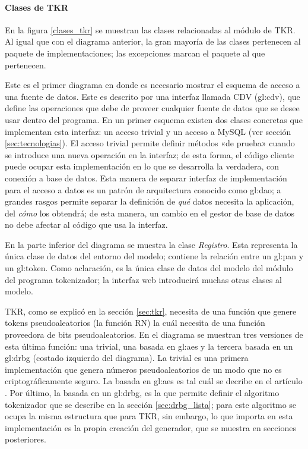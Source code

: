 %
%
%

\paragraph{Clases de TKR}

En la figura \ref{clases_tkr} se muestran las clases relacionadas al módulo de
TKR. Al igual que con el diagrama anterior, la gran mayoría de las clases
pertenecen al paquete de implementaciones; las excepciones marcan el paquete al
que pertenecen.

Este es el primer diagrama en donde es necesario mostrar el esquema de acceso a
una fuente de datos. Este es descrito por una interfaz llamada CDV
(\acrlong{gl:cdv}), que define las operaciones que debe de proveer cualquier
fuente de datos que se desee usar dentro del programa. En un primer esquema
existen dos clases concretas que implementan esta interfaz: un acceso trivial y
un acceso a MySQL (ver sección \ref{sec:tecnologias}). El acceso trivial permite
definir métodos «de prueba» cuando se introduce una nueva operación en la
interfaz; de esta forma, el código cliente puede ocupar esta implementación en
lo que se desarrolla la verdadera, con conexión a base de datos. Esta manera de
separar interfaz de implementación para el acceso a datos es un patrón de
arquitectura conocido como \gls{gl:dao}; a grandes rasgos permite separar la
definición de \textit{qué} datos necesita la aplicación, del \textit{cómo} los
obtendrá; de esta manera, un cambio en el gestor de base de datos no debe
afectar al código que usa la interfaz.

En la parte inferior del diagrama se muestra la clase \textit{Registro}. Esta
representa la única clase de datos del entorno del modelo; contiene la relación
entre un \gls{gl:pan} y un \gls{gl:token}. Como aclaración, es la única clase de
datos del modelo del módulo del programa tokenizador; la interfaz web
introducirá muchas otras clases al modelo.

TKR, como se explicó en la sección \ref{sec:tkr}, necesita de una función que
genere tokens pseudoaleatorios (la función RN) la cuál necesita de una función
proveedora de bits pseudoaleatorios. En el diagrama se muestran tres versiones
de esta última función: una trivial, una basada en \gls{gl:aes} y la tercera
basada en un \gls{gl:drbg} (costado izquierdo del diagrama). La trivial es una
primera implementación que genera números pseudoaleatorios de un modo que no es
criptográficamente seguro. La basada en \gls{gl:aes} es tal cuál se decribe en
el artículo \cite{doc_sandra}. Por último, la basada en un \gls{gl:drbg},
es la que permite definir el algoritmo tokenizador que se describe en la sección
\ref{sec:drbg_lista}; para este algoritmo se ocupa la misma estructura que para
TKR, sin embargo, lo que importa en esta implementación es la propia creación
del generador, que se muestra en secciones posteriores.


